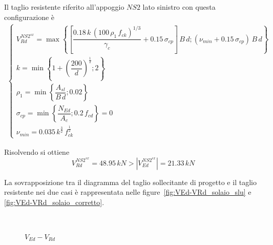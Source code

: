 Il taglio resistente riferito all'appoggio $NS2$ lato sinistro con questa configurazione è
\begin{align*}
	\begin{cases}
		V_{Rd}^{NS2^{sx}} = \max\left\{\left[\dfrac{0.18\,k\,\left(100\,\rho_1\,f_{ck}\right)^{1/3}}{\gamma_c} + 0.15\,\sigma_{cp}\right]\,B\,d; (\nu_{min} + 0.15\,\sigma_{cp})\,B\,d\right\}\\
		k = \min\left\{ 1+\left(\dfrac{200}{d}\right)^\frac{1}{2}; 2\right\}\\
		\rho_1 = \min\left\{\dfrac{A_{sl}}{B\,d}; 0.02\right\}\\
		\sigma_{cp} = \min\left\{\dfrac{N_{Ed}}{A_c}; 0.2\,f_{cd}\right\} = 0\\
		\nu_{min} = 0.035\,k^{\frac{3}{2}}\,f_{ck}^{\frac{1}{2}}
	\end{cases}
\end{align*}

Risolvendo si ottiene
\[
V_{Rd}^{NS2^{sx}} = 48.95\,kN > \left|V_{Ed}^{NS2^{sx}}\right| = 21.33\,kN
\]

La sovrapposizione tra il diagramma del taglio sollecitante di progetto e il taglio resistente nei due casi è rappresentata nelle figure~\ref{fig:VEd-VRd_solaio_slu} e \ref{fig:VEd-VRd_solaio_corretto}.

\begin{figure}
	\centering
	\\
	\caption{$V_{Ed} - V_{Rd}$}
	\label{fig:VEd-VRd_solaio}
\end{figure}


